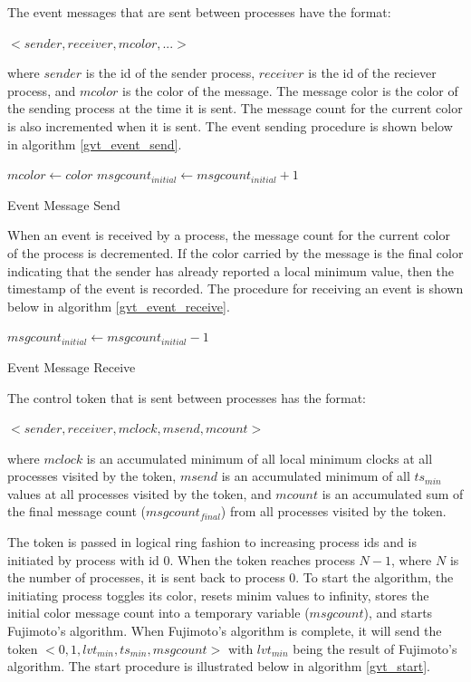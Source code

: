 \documentclass[11pt]{book}
\begin{document}
\noindent
The event messages that are sent between processes have the format:

    $<sender, receiver, mcolor,...>$

\noindent
where $sender$ is the id of the sender process, $receiver$ is the id of the reciever process,
and $mcolor$ is the color of the message. The message color is the color of the sending
process at the time it is sent. The message count for the current color is also incremented
when it is sent. The event sending procedure is shown below in algorithm \ref{gvt_event_send}.

\begin{algorithm}
\DontPrintSemicolon
\SetAlgoVlined
    $mcolor \gets color$\;
     {
      $msgcount_{initial} \gets msgcount_{initial} + 1$\;
    }
\caption{Event Message Send}\label{gvt_event_send}
\end{algorithm}

When an event is received by a process, the message count for the current color of the process
is decremented. If the color carried by the message is the final color indicating that the
sender has already reported a local minimum value, then the timestamp of the event is recorded.
The procedure for receiving an event is shown below in algorithm \ref{gvt_event_receive}.

\begin{algorithm}
\DontPrintSemicolon
\SetAlgoVlined
     {
        $msgcount_{initial} \gets msgcount_{initial} - 1$\;
    }
\caption{Event Message Receive}\label{gvt_event_receive}
\end{algorithm}

\noindent
The control token that is sent between processes has the format:

    $<sender, receiver, mclock, msend, mcount>$

\noindent
where $mclock$ is an accumulated minimum of all local minimum clocks at all processes
visited by the token, $msend$ is an accumulated minimum of all $ts_{min}$ values at all
processes visited by the token, and $mcount$ is an accumulated sum of the final message count
($msgcount_{final}$) from all processes visited by the token.

The token is passed in logical ring fashion to increasing process ids and is initiated by process
with id 0. When the token reaches process $N-1$, where $N$ is the number of processes, it is
sent back to process 0. To start the algorithm, the initiating process toggles its color, resets
minim values to infinity, stores the initial color message count into a temporary variable
($msgcount$), and starts Fujimoto's algorithm. When Fujimoto's algorithm is complete, it will
send the token $<0, 1, lvt_{min}, ts_{min}, msgcount>$ with $lvt_{min}$ being the result of
Fujimoto's algorithm. The start procedure is illustrated below in algorithm \ref{gvt_start}.
\end{document}
